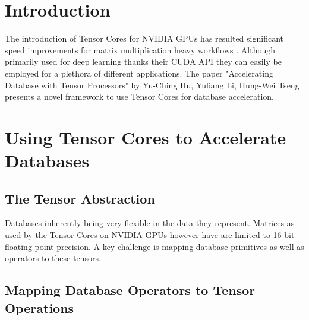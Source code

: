 \documentclass{paper}
\title{\titleVar}
\author{David R. Zollikofer\\ ETH Zürich}
\date{\today}
\begin{document}
	

	

\section{Introduction}
The introduction of Tensor Cores for NVIDIA GPUs has resulted significant speed improvements for matrix multiplication heavy workflows \cite{markidis2018nvidia}. Although primarily used for deep learning thanks their CUDA API they can easily be employed for a plethora of different applications. The paper "Accelerating Database with Tensor Processors" by Yu-Ching Hu, Yuliang Li, Hung-Wei Tseng \cite{hu2021tcudb} presents a novel framework to use Tensor Cores for database acceleration.
	
	\section{Using Tensor Cores to Accelerate Databases}
	
	\subsection{The Tensor Abstraction}
	Databases inherently being very flexible in the data they represent. Matrices as used by the Tensor Cores on NVIDIA GPUs however have are limited to 16-bit floating point precision. A key challenge is mapping database primitives as well as operators to these tensors.
	
	\subsection{Mapping Database Operators to Tensor Operations}
	
\end{document}
